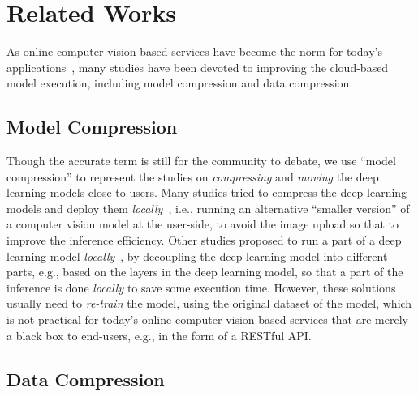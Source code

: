 \section{Related Works}
\label{sec: related_works}

As online computer vision-based services have become the norm for today's applications~\cite{huynh2017deepmon, agrawal2015cloudcv}, many studies have been devoted to improving the cloud-based model execution, including model compression and data compression.

\subsection{Model Compression}

Though the accurate term is still for the community to debate, we use ``model compression'' to represent the studies on \emph{compressing} and \emph{moving} the deep learning models close to users. Many studies tried to compress the deep learning models and deploy them \emph{locally}~\cite{prun_quanti, pruning_han, quantize, quantize_3bit, quantization, structured_pruning}, i.e., running an alternative ``smaller version'' of a computer vision model at the user-side, to avoid the image upload so that to improve the inference efficiency. Other studies proposed to run a part of a deep learning model \emph{locally}~\cite{ILP_Decoupling, jalad, Edge_LBP, Neurosurgeon}, by decoupling the deep learning model into different parts, e.g., based on the layers in the deep learning model, so that a part of the inference is done \emph{locally} to save some execution time. However, these solutions usually need to \emph{re-train} the model, using the original dataset of the model, which is not practical for today's online computer vision-based services that are merely a black box to end-users, e.g., in the form of a RESTful API.

\subsection{Data Compression}

